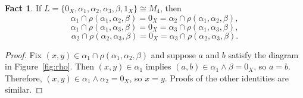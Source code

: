 \documentclass{amsart}
\theoremstyle{plain}
\theoremstyle{definition}
\newtheorem{lemma}{Lemma}
\newtheorem{fact}{Fact}
\theoremstyle{definition}
\numberwithin{equation}{section}
\newcommand{\<}{\ensuremath{\langle}}
\renewcommand{\>}{\ensuremath{\rangle}}
\renewcommand{\leq}{\ensuremath{\leqslant}}
\newcommand{\meet}{\ensuremath{\wedge}}
\begin{document}
\begin{fact} If 
$L = \{0_X, \alpha_1, \alpha_2, \alpha_3, \beta, 1_X\} \cong  M_4$,
then
  \[
\alpha_1 \cap \rho(\alpha_1, \alpha_2, \beta)
= 0_X =  \alpha_2 \cap \rho(\alpha_1, \alpha_2, \beta),
\]
\[
\alpha_1 \cap \rho(\alpha_1, \alpha_3, \beta)
= 0_X =  \alpha_3 \cap \rho(\alpha_1, \alpha_3, \beta),
\]
\[
\alpha_2 \cap \rho(\alpha_2, \alpha_3, \beta)
 = 0_X = \alpha_3 \cap \rho(\alpha_2, \alpha_3, \beta).
\]
\end{fact}
\begin{proof}
  Fix $(x,y) \in  \alpha_1 \cap \rho(\alpha_1, \alpha_2, \beta)$ and suppose 
  $a$ and $b$ satisfy the diagram in Figure~\ref{fig:rho}.  Then 
  $(x,y) \in \alpha_1$ implies $(a, b)\in \alpha_1 \meet \beta = 0_X$, so 
  $a = b$.  Therefore, $(x,y) \in \alpha_1 \meet \alpha_2 = 0_X$, so $x = y$.
  Proofs of the other identities are similar.
\end{proof}




\end{document}
